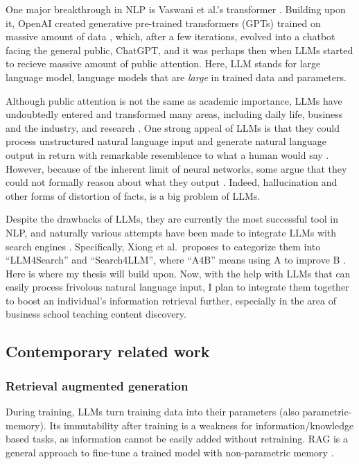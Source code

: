 \documentclass[final-report]{report-template}
\begin{document}
One major breakthrough in NLP is Vaswani et al.'s transformer \cite{transformer}. 
Building upon it, OpenAI created generative pre-trained transformers (GPTs)
trained on massive amount of data \cite{gpt1}, which, after a few iterations,
evolved into a chatbot facing the general public, ChatGPT, and it was perhaps
then when LLMs started to recieve massive amount of public attention. Here, LLM
stands for large language model, language models that are \emph{large} in
trained data and parameters.

Although public attention is not the same as academic importance, LLMs
have undoubtedly entered and transformed many areas, including daily life,
business and the industry, and research \cite{llm.impact.1}. One strong appeal
of LLMs is that they could process unstructured natural language input and generate
natural language output in return with remarkable resemblence to what a human
would say \cite{llm.power.1, llm.power.2}. However, because of the inherent
limit of neural networks, some argue that they could not formally reason about
what they output \cite{llm.limit.1, llm.limit.2, llm.limit.3}. Indeed,
hallucination \cite{llm.hallucination.1, llm.hallucination.2} and other forms
of distortion of facts, is a big problem of LLMs.

Despite the drawbacks of LLMs, they are currently the most successful tool in
NLP, and naturally various attempts have been made to integrate LLMs with search
engines \cite{llm.meet.search.1, llm.meet.search.2, llm.meet.search.3}.
Specifically, Xiong et al.\ proposes to categorize them into ``LLM4Search'' and
``Search4LLM'', where ``A4B'' means using A to improve B
\cite{llm.meet.search.1}. Here is where my thesis will build upon.  Now, with
the help with LLMs that can easily process frivolous natural language input, I
plan to integrate them together to boost an individual's information retrieval
further, especially in the area of business school teaching content discovery.

\subsection{Contemporary related work} \label{sec.related.work}
\subsubsection{Retrieval augmented generation}
During training, LLMs turn training data into their parameters (also
parametric-memory). Its immutability after training is a
weakness for information/knowledge based tasks, as information
cannot be easily added without retraining. RAG is a general approach to
fine-tune a trained model with non-parametric memory \cite{rag}. 
\end{document}
